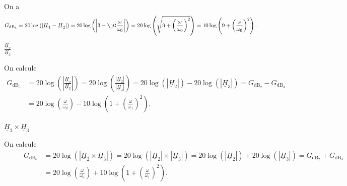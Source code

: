 \begin{corrigeNewpage}
	On a 
	\[
	G_{\text{dB}_{4}} =20\log\left(\left| \underline{H}_1-\underline{H}_2 \right| \right)
		= 20\log\left(\left| 3-\jC \frac{ \omega}{\omega_0} \right| \right) = 20\log\left(\sqrt{9+\left( \frac{\omega}{\omega_0} \right)^2}\right) = 10 \log\left(9+\left( \frac{\omega}{\omega_0} \right)^2\right).
		\]
\end{corrigeNewpage}




\begin{enonce}
	$\frac{\underline{H}_2}{\underline{H}_3}$
\end{enonce}


\begin{corrige}
On calcule 
	\begin{align*}
	G_{\text{dB}_{5}} &=20\log\left(\left| \frac{\underline{H}_2}{\underline{H}_3} \right| \right)
	= 20\log\left( \frac{\left| \underline{H}_2 \right|}{ \left| \underline{H}_3 \right|}  \right)
	= 20\log\left( \left| \underline{H}_2 \right| \right) - 20 \log \left( \left| \underline{H}_3 \right|  \right) = G_{\text{dB}_{2}} - G_{\text{dB}_{3}}\\
	&= 20\log\left(\frac{\omega}{\omega_0}\right) - 10\log\left( 1+ \left( \frac{\omega}{\omega_1} \right)^2\right).
	\end{align*}
\end{corrige}




\begin{enonce}
	$\underline{H}_2 \times \underline{H}_3$
\end{enonce}


\begin{corrige}
On calcule	
	\begin{align*}
		\hspace{1cm}
		G_{\text{dB}_{6}} &=20\log\left(\left|\underline{H}_2 \times \underline{H}_3 \right| \right)
		= 20\log\left( \left| \underline{H}_2 \right| \times \left| \underline{H}_3 \right|  \right)
		= 20\log\left( \left| \underline{H}_2 \right| \right) + 20 \log \left( \left| \underline{H}_3 \right|  \right) = G_{\text{dB}_{2}} + G_{\text{dB}_{3}}\\
		&= 20\log\left(\frac{\omega}{\omega_0}\right) + 10\log\left( 1+ \left( \frac{\omega}{\omega_1} \right)^2\right).
		\end{align*}
\end{corrige}

